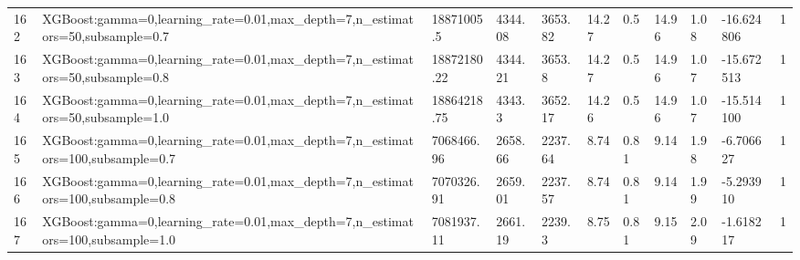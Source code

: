 \begin{longtable}{C{0.8cm} L{2cm} C{1.15cm} C{1.15cm} C{1.15cm} C{1.15cm} C{0.85cm} C{1.25cm} C{1.2cm} C{1.5cm} C{1.0cm}}
162 & XGBoost:\newline gamma=0,\newline learning\_rate=0.01,\newline max\_depth=7,\newline n\_estimators=50,\newline subsample=0.7 & 18871005.5 & 4344.08 & 3653.82 & 14.27 & 0.5 & 14.96 & 1.08 & -16.624806 & 1 \\
163 & XGBoost:\newline gamma=0,\newline learning\_rate=0.01,\newline max\_depth=7,\newline n\_estimators=50,\newline subsample=0.8 & 18872180.22 & 4344.21 & 3653.8 & 14.27 & 0.5 & 14.96 & 1.07 & -15.672513 & 1 \\
164 & XGBoost:\newline gamma=0,\newline learning\_rate=0.01,\newline max\_depth=7,\newline n\_estimators=50,\newline subsample=1.0 & 18864218.75 & 4343.3 & 3652.17 & 14.26 & 0.5 & 14.96 & 1.07 & -15.514100 & 1 \\
165 & XGBoost:\newline gamma=0,\newline learning\_rate=0.01,\newline max\_depth=7,\newline n\_estimators=100,\newline subsample=0.7 & 7068466.96 & 2658.66 & 2237.64 & 8.74 & 0.81 & 9.14 & 1.98 & -6.706627 & 1 \\
166 & XGBoost:\newline gamma=0,\newline learning\_rate=0.01,\newline max\_depth=7,\newline n\_estimators=100,\newline subsample=0.8 & 7070326.91 & 2659.01 & 2237.57 & 8.74 & 0.81 & 9.14 & 1.99 & -5.293910 & 1 \\
167 & XGBoost:\newline gamma=0,\newline learning\_rate=0.01,\newline max\_depth=7,\newline n\_estimators=100,\newline subsample=1.0 & 7081937.11 & 2661.19 & 2239.3 & 8.75 & 0.81 & 9.15 & 2.09 & -1.618217 & 1 \\

\end{longtable}

